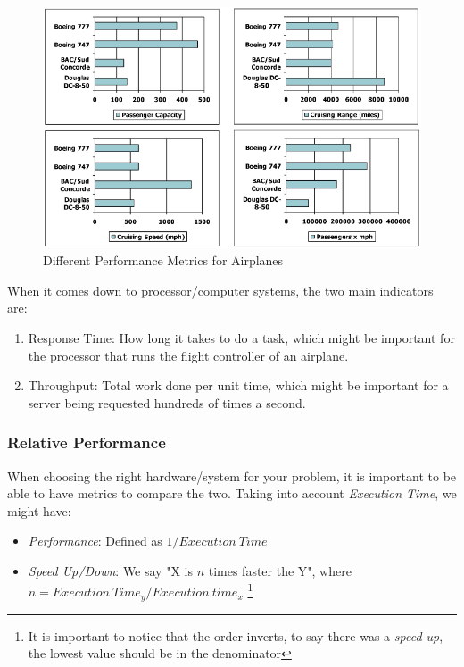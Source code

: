 \documentclass{article}
\begin{document}
\begin{figure}[h]
    \begin{center}
        \includegraphics[width=.7\textwidth]{imgs/performance_eg.png}
    \end{center}
    \caption{Different Performance Metrics for Airplanes}
\end{figure}
When it comes down to processor/computer systems, the two main indicators are:
\begin{enumerate}
    \item Response Time: How long it takes to do a task, which might be important for the processor that runs the flight controller of an airplane.
    \item Throughput: Total work done per unit time, which might be important for a server being requested hundreds of times a second.
\end{enumerate}

\subsubsection{Relative Performance}
When choosing the right hardware/system for your problem, it is important to be able to have metrics to compare the two. Taking into account \emph{Execution Time}, we might have:
\begin{itemize}
    \item \emph{Performance}: Defined as $1/Execution \ Time$
    \item \emph{Speed Up/Down}: We say "X is $n$ times faster the Y", where $n = Execution \ Time_y / Execution \ time_x$ \footnote{It is important to notice that the order inverts, to say there was a \emph{speed up}, the lowest value should be in the denominator}
\end{itemize}
\end{document}
